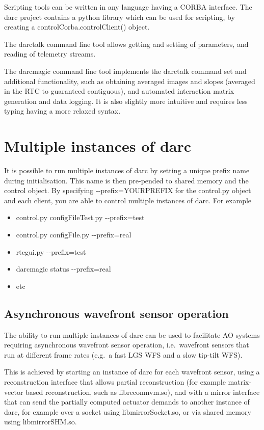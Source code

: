 \documentclass[a4,10pt]{article}
\begin{document}
Scripting tools can be written in any language having a CORBA
interface.  The darc project contains a python library which can be
used for scripting, by creating a controlCorba.controlClient() object.

The darctalk command line tool allows getting and setting of
parameters, and reading of telemetry streams.

The darcmagic command line tool implements the darctalk command set
and additional functionality, such as obtaining averaged images and
slopes (averaged in the RTC to guaranteed contiguous), and automated
interaction matrix generation and data logging.  It is also slightly
more intuitive and requires less typing having a more relaxed syntax.

\section{Multiple instances of darc}
It is possible to run multiple instances of darc by setting a unique prefix
name during initialisation.  This name is then pre-pended to shared
memory and the control object.  By specifying -{-}prefix=YOURPREFIX for
the control.py object and each client, you are able to control
multiple instances of darc.  For example
\begin{itemize}
\item control.py configFileTest.py -{-}prefix=test
\item control.py configFile.py -{-}prefix=real
\item rtcgui.py -{-}prefix=test
\item darcmagic status -{-}prefix=real
\item etc
\end{itemize}

\subsection{Asynchronous wavefront sensor operation}
The ability to run multiple instances of darc can be used to
facilitate AO systems requiring asynchronous wavefront sensor
operation, i.e.\ wavefront sensors that run at different frame rates
(e.g.\ a fast LGS WFS and a slow tip-tilt WFS).

This is achieved by starting an instance of darc for each wavefront
sensor, using a reconstruction interface that allows partial
reconstruction (for example matrix-vector based reconstruction, such
as libreconmvm.so), and with a mirror interface that can send the
partially computed actuator demands to another instance of darc, for
example over a socket using libmirrorSocket.so, or via shared memory
using libmirrorSHM.so.
\end{document}
